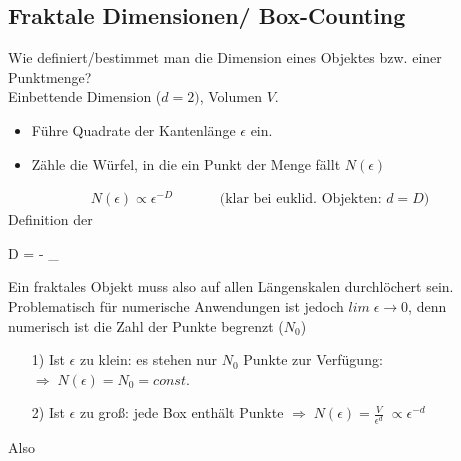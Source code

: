 \documentclass[12pt]{article}
\begin{document}
\subsection*{Fraktale Dimensionen/ Box-Counting}
Wie definiert/bestimmet man die Dimension eines Objektes bzw. einer Punktmenge? \\ %
Einbettende Dimension ($d=2)$, Volumen $V$. \begin{itemize}
\item Führe Quadrate der Kantenlänge $\epsilon$ ein.
\item Zähle die Würfel, in die ein Punkt der Menge fällt $N(\epsilon)$
\end{itemize}
\begin{align*}
N(\epsilon) \propto \epsilon ^{-D} \qquad \quad \text{ (klar bei euklid. Objekten: }d=D)
\end{align*}
Definition der
\begin{tcolorbox}[ams gather,title= Hausdorff-Dimension, colback=blue!10!white, colframe=blue!30!black] 
D = - \lim_{\epsilon {}} 
\end{tcolorbox} Ein fraktales Objekt muss also auf allen Längenskalen durchlöchert sein. Problematisch für numerische Anwendungen ist jedoch $lim \; \epsilon \to 0$, denn numerisch ist die Zahl der Punkte begrenzt ($N_0$)
\begin{enumerate}
\item[1)] Ist $\epsilon$ zu klein: es stehen nur $N_0$ Punkte zur Verfügung: $\Rightarrow \; N(\epsilon) = N_0 = const.$
\item[2)] Ist $\epsilon$ zu groß: jede Box enthält Punkte $\Rightarrow \; N(\epsilon) = \frac{V}{\epsilon^d} \; \propto \epsilon^{-d}$
\end{enumerate}
Also %
\end{document}

